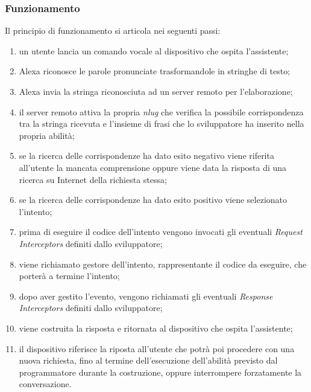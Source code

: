 		\subsubsection{Funzionamento}
		Il principio di funzionamento si articola nei seguenti passi:
		\begin{enumerate}
			\item un utente lancia un comando vocale al dispositivo che ospita l'assistente;
			\item Alexa riconosce le parole pronunciate trasformandole in stringhe di testo;
			\item Alexa invia la stringa riconosciuta ad un server remoto per l'elaborazione;
			\item il server remoto attiva la propria \emph{\gls{nlug}} che verifica la possibile corrispondenza tra la stringa ricevuta e l'insieme di frasi che lo sviluppatore ha inserito nella propria abilità;
			\item se la ricerca delle corrispondenze ha dato esito negativo viene riferita all'utente la mancata comprensione oppure viene data la risposta di una ricerca su Internet della richiesta stessa;
			\item se la ricerca delle corrispondenze ha dato esito positivo viene selezionato l'intento;
			\item prima di eseguire il codice dell'intento vengono invocati gli eventuali \emph{Request Interceptors} definiti dallo sviluppatore;
			\item viene richiamato gestore dell'intento, rappresentante il codice da eseguire, che porterà a termine l'intento;
			\item dopo aver gestito l'evento, vengono richiamati gli eventuali \emph{Response Interceptors} definiti dallo sviluppatore;
			\item viene costruita la risposta e ritornata al dispositivo che ospita l'assistente;
			\item il dispositivo riferisce la riposta all'utente che potrà poi procedere con una nuova richiesta, fino al termine dell'esecuzione dell'abilità previsto dal programmatore durante la costruzione, oppure interrompere forzatamente la conversazione.
		\end{enumerate}
